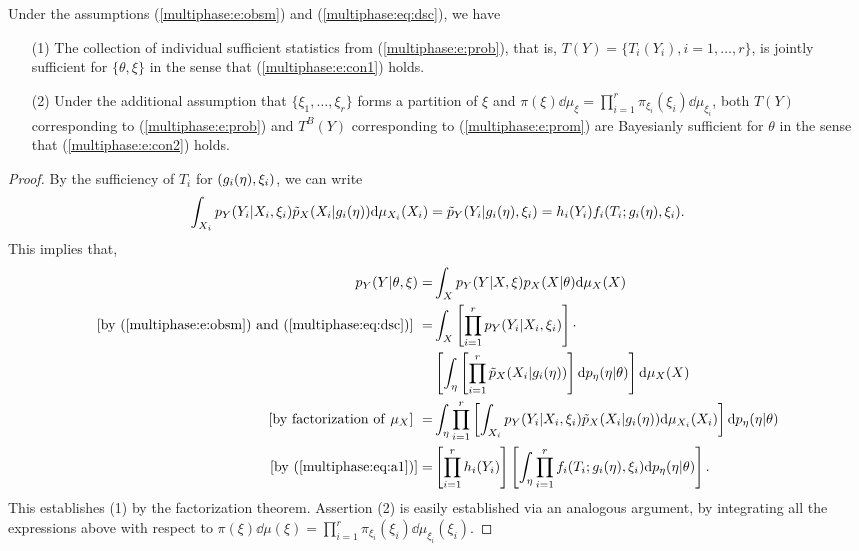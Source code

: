 \begin{theorem}
\label{multiphase:thm:dsc}
Under the assumptions (\ref{multiphase:e:obsm}) and (\ref{multiphase:eq:dsc}), we have 
\begin{itemize}
\item[(1)] The collection of individual sufficient statistics from (\ref{multiphase:e:prob}), that is, $T(Y)=\{T_i(Y_i), i=1,\ldots, r\}$,  is  jointly sufficient for $\{\theta,\xi\}$ in the sense  that  (\ref{multiphase:e:con1}) holds.
\item[(2)] Under the additional assumption that $\{\xi_1,\ldots, \xi_r\}$ forms a partition of $\xi$ and $\pi(\xi)\dd \mu_{\xi}=\prod_{i=1}^r \pi_{\xi_i}(\xi_i)\dd\mu_{\xi_i}$, both $T(Y)$ corresponding to (\ref{multiphase:e:prob}) and $T^B(Y)$ corresponding to  (\ref{multiphase:e:prom}) are Bayesianly sufficient  for $\theta$  in the sense that (\ref{multiphase:e:con2}) holds. 
\end{itemize}
\end{theorem}
%       
\begin{proof}
 By the sufficiency of $T_i$ for $(g_i(\eta), \xi_i)$, we can write
\begin{equation}\label{multiphase:eq:a1}
  \int_{X_i} \pobs(Y_i | X_i, \obsparam_i) \pwork(X_i | g_i(\workparam)) \dd\mu_{X_i}(X_i) = \pywork (Y_i | g_i(\workparam), \obsparam_i) =h_i(Y_i) f_i(T_i ; g_i(\workparam), \obsparam_i).
\end{equation}
This implies that, 
\begin{align*}
\pobs(Y | \param, \obsparam) =&  \int_{X} \pobs(Y | X, \obsparam) \psci(X | \param)\dd \mu_X(X) \\
[{\rm by}\ (\ref{multiphase:e:obsm}) \ {\rm and}\ (\ref{multiphase:eq:dsc})]\ =& \int_{X} \left[ \prod_{i=1}^{r} \pobs(Y_i | X_i, \obsparam_i) \right] \cdot \\
& \left[ \int_{\eta} \left[ \prod_{i=1}^{r} \pwork(X_i | g_i(\workparam)) \right]\dd p_\workparam(\workparam | \param) \right]\dd \mu_X(X) \\
[{\rm by\ factorization\ of} \ \mu_X]\ =& \int_{\eta} \prod_{i=1}^{r} \left[ \int_{X_i} \pobs(Y_i | X_i, \obsparam_i) \pwork(X_i | g_i(\workparam))\dd \mu_{X_i}(X_i) \right]\dd p_\workparam(\workparam | \param)  \\ 
[{\rm by}\ (\ref{multiphase:eq:a1})] =& \left[ \prod_{i=1}^{r} h_i(Y_i) \right] \left[ \int_{\eta} \prod_{i=1}^{r} f_i(T_i;g_i(\workparam), \obsparam_i)\dd p_\workparam(\workparam | \param)\right] .
\end{align*}
This establishes (1) by the factorization theorem. 
Assertion (2) is easily established via an analogous argument, by integrating all the expressions above with respect to $\pi(\xi)\dd\mu(\xi)=\prod_{i=1}^r \pi_{\xi_i}(\xi_i)\dd \mu_{\xi_i}(\xi_i)$. 
\end{proof}

